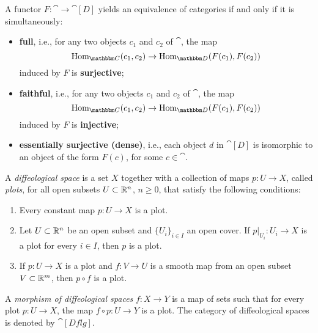 \documentclass[a4paper,11pt]{article}  %
\newcommand{\Dflg}{\cat[Dflg]}
\begin{document}
\begin{definition}
A functor \( F : \cat \to \cat[D] \) yields an equivalence of categories if and only if it is simultaneously:
\begin{itemize}
    \item \textbf{full}, i.e., for any two objects \( c_1 \) and \( c_2 \) of \(\cat\), the map 
    \[
    \Hom_{\cat}(c_1, c_2) \to \Hom_{\cat[D]}(F(c_1), F(c_2))
    \]
    induced by \( F \) is \textbf{surjective};
    
    \item \textbf{faithful}, i.e., for any two objects \( c_1 \) and \( c_2 \) of \(\cat\), the map 
    \[
    \Hom_{\cat}(c_1, c_2) \to \Hom_{\cat[D]}(F(c_1), F(c_2))
    \]
    induced by \( F \) is \textbf{injective};
    
    \item \textbf{essentially surjective (dense)}, i.e., each object \( d \) in \(\cat[D]\) is isomorphic to an object of the form \( F(c) \), for some \( c \in \cat \).
\end{itemize}
\end{definition}

\begin{definition}
A \emph{diffeological space} is a set \( X \) together with a collection of maps \( p : U \to X \), called \emph{plots}, for all open subsets \( U \subset \mathbb{R}^n \), \( n \geq 0 \), that satisfy the following conditions:
\begin{enumerate}
    \item Every constant map \( p : U \to X \) is a plot.
    \item Let \( U \subset \mathbb{R}^n \) be an open subset and \( \{U_i\}_{i \in I} \) an open cover. If \( p|_{U_i} : U_i \to X \) is a plot for every \( i \in I \), then \( p \) is a plot.
    \item If \( p : U \to X \) is a plot and \( f : V \to U \) is a smooth map from an open subset \( V \subset \mathbb{R}^m \), then \( p \circ f \) is a plot.
\end{enumerate}
A \emph{morphism of diffeological spaces} \( f : X \to Y \) is a map of sets such that for every plot \( p : U \to X \), the map \( f \circ p : U \to Y \) is a plot. The category of diffeological spaces is denoted by \( \Dflg \).
\end{definition}


			
			
\end{document}
